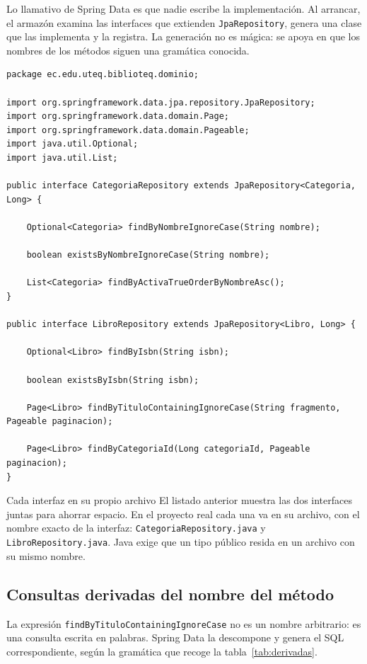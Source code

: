 \documentclass[11pt,a4paper,openany]{book}
\begin{document}
Lo llamativo de Spring Data es que nadie escribe la implementación. Al arrancar, el armazón examina las interfaces que extienden \texttt{JpaRepository}, genera una clase que las implementa y la registra. La generación no es mágica: se apoya en que los nombres de los métodos siguen una gramática conocida.

\begin{lstlisting}[style=java,caption={Repositorios de las tres entidades del catalogo.},label={lst:repos}]
package ec.edu.uteq.biblioteq.dominio;

import org.springframework.data.jpa.repository.JpaRepository;
import org.springframework.data.domain.Page;
import org.springframework.data.domain.Pageable;
import java.util.Optional;
import java.util.List;

public interface CategoriaRepository extends JpaRepository<Categoria, Long> {

	Optional<Categoria> findByNombreIgnoreCase(String nombre);

	boolean existsByNombreIgnoreCase(String nombre);

	List<Categoria> findByActivaTrueOrderByNombreAsc();
}

public interface LibroRepository extends JpaRepository<Libro, Long> {

	Optional<Libro> findByIsbn(String isbn);

	boolean existsByIsbn(String isbn);

	Page<Libro> findByTituloContainingIgnoreCase(String fragmento, Pageable paginacion);

	Page<Libro> findByCategoriaId(Long categoriaId, Pageable paginacion);
}
\end{lstlisting}

\begin{cajaadvertencia}{Cada interfaz en su propio archivo}
	El listado anterior muestra las dos interfaces juntas para ahorrar espacio. En el proyecto real cada una va en su archivo, con el nombre exacto de la interfaz: \texttt{CategoriaRepository.java} y \texttt{LibroRepository.java}. Java exige que un tipo público resida en un archivo con su mismo nombre.
\end{cajaadvertencia}

\subsection{Consultas derivadas del nombre del método}
\label{sec:consultas-derivadas}

La expresión \texttt{findByTituloContainingIgnoreCase} no es un nombre arbitrario: es una consulta escrita en palabras. Spring Data la descompone y genera el SQL correspondiente, según la gramática que recoge la tabla~\ref{tab:derivadas}.
\end{document}

